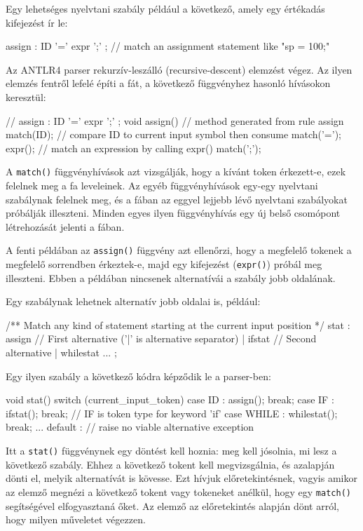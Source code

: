\documentclass[12pt, a4paper]{report}
\newcommand{\f}[1]{\texttt{#1}}
\begin{document}
Egy lehetséges nyelvtani szabály például a következő, amely egy értékadás kifejezést ír le:

\begin{antlr4code}
assign : ID '=' expr ';' ; // match an assignment statement like "sp = 100;"
\end{antlr4code}

Az ANTLR4 parser rekurzív-leszálló (recursive-descent) elemzést végez. Az ilyen elemzés fentről lefelé építi a fát, a következő függvényhez hasonló hívásokon keresztül:

\begin{javacode}
// assign : ID '=' expr ';' ;
void assign() { // method generated from rule assign
	match(ID); // compare ID to current input symbol then consume
	match('=');
	expr(); // match an expression by calling expr()
	match(';');
}
\end{javacode}

A \f{match()} függvényhívások azt vizsgálják, hogy a kívánt token érkezett-e, ezek felelnek meg a fa leveleinek. Az egyéb függvényhívások egy-egy nyelvtani szabálynak felelnek meg, és a fában az eggyel lejjebb lévő nyelvtani szabályokat próbálják illeszteni. Minden egyes ilyen függvényhívás egy új belső csomópont létrehozását jelenti a fában.

A fenti példában az \f{assign()} függvény azt ellenőrzi, hogy a megfelelő tokenek a megfelelő sorrendben érkeztek-e, majd egy kifejezést (\f{expr()}) próbál meg illeszteni. Ebben a példában nincsenek alternatívái a szabály jobb oldalának.

Egy szabálynak lehetnek alternatív jobb oldalai is, például:

\begin{antlr4code}
/** Match any kind of statement starting at the current input position */
stat : assign // First alternative ('|' is alternative separator)
     | ifstat // Second alternative
     | whilestat
     ...
;
\end{antlr4code}

Egy ilyen szabály a következő kódra képződik le a parser-ben:

\begin{javacode}
void stat() {
	switch (current_input_token) {
		case ID : assign(); break;
		case IF : ifstat(); break; // IF is token type for keyword 'if'
		case WHILE : whilestat(); break;
		...
		default : // raise no viable alternative exception
	}
}
\end{javacode}

Itt a \f{stat()} függvénynek egy döntést kell hoznia: meg kell jósolnia, mi lesz a következő szabály. Ehhez a következő tokent kell megvizsgálnia, és azalapján dönti el, melyik alternatívát is kövesse. Ezt hívjuk előretekintésnek, vagyis amikor az elemző megnézi a következő tokent vagy tokeneket anélkül, hogy egy \f{match()} segítségével elfogyasztaná őket. Az elemző az előretekintés alapján dönt arról, hogy milyen műveletet végezzen.
\end{document}
